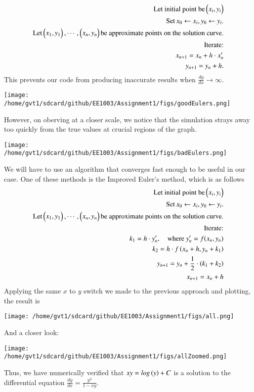\documentclass[journal]{IEEEtran}
\begin{document}
\begin{align*}
	\text{Let initial point be} \begin{pmatrix}x_i, y_i\end{pmatrix}&\\
	\text{Set}\, x_0\leftarrow x_i, y_0\leftarrow y_i. \\\text{Let} \begin{pmatrix}x_1, y_1\end{pmatrix}, \cdots, \begin{pmatrix}x_n, y_n\end{pmatrix} \text{be approximate points on the solution curve.}&\\
	\text{Iterate:}\\ x_{n+1} = x_{n} + h \cdot x_n^{\prime} \\ y_{n+1} = y_n + h.&
\end{align*}
This prevents our code from producing inaccurate results when $\frac{dy}{dx} \to \infty$.
\begin{center}
	\texttt{[image: /home/gvt1/sdcard/github/EE1003/Assignment1/figs/goodEulers.png]}  
\end{center}
However, on oberving at a closer scale, we notice that the simulation strays away too quickly from the true values at crucial regions of the graph. 
\begin{center} 
	\texttt{[image: /home/gvt1/sdcard/github/EE1003/Assignment1/figs/badEulers.png]}  
\end{center}
We will have to use an algorithm that converges fast enough to be useful in our case. 
One of these methods is the Improved Euler's method, which is as follows
\begin{align*}
	\text{Let initial point be} \begin{pmatrix}x_i, y_i\end{pmatrix}&\\
	\text{Set}\, x_0 \leftarrow x_i, y_0 \leftarrow y_i. \\\text{Let} \begin{pmatrix}x_1, y_1\end{pmatrix}, \cdots, \begin{pmatrix}x_n, y_n\end{pmatrix} \text{be approximate points on the solution curve.}&\\
	\text{Iterate:} &\\
	k_1 = h \cdot y_n^{\prime}, \quad \text{where } y_n^{\prime} = f(x_n, y_n)& \\
	k_2 = h \cdot f\left(x_n + h, y_n + k_1\right)& \\
	y_{n+1} = y_n + \frac{1}{2} \cdot (k_1 + k_2)& \\
	x_{n+1} = x_n + h&
\end{align*}
Applying the same $x$ to $y$ switch we made to the previous approach and plotting, the result is
\begin{center} 
	\texttt{[image: /home/gvt1/sdcard/github/EE1003/Assignment1/figs/all.png]}  
\end{center}
And a closer look:
\begin{center} 
	\texttt{[image: /home/gvt1/sdcard/github/EE1003/Assignment1/figs/allZoomed.png]}  
\end{center}
Thus, we have numerically verified that $xy = log\left(y\right) + C$ is a solution to the differential equation $\frac{dy}{dx} = \frac{y^2}{1-xy}$.
\end{document}
